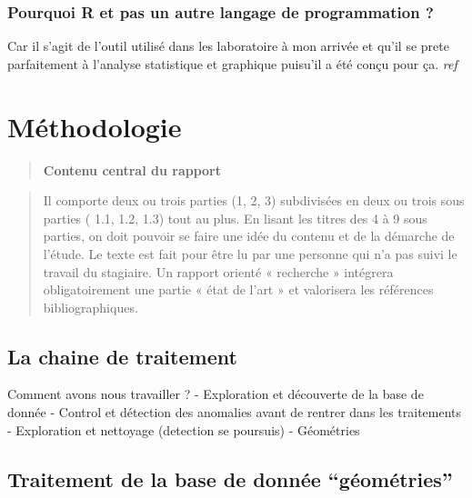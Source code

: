 \documentclass[
  12pt,
  a4paperpaper,
]{book}
\begin{document}
\hypertarget{pourquoi-r-et-pas-un-autre-langage-de-programmation}{%
\subsection{Pourquoi R et pas un autre langage de programmation
?}\label{pourquoi-r-et-pas-un-autre-langage-de-programmation}}

Car il s'agit de l'outil utilisé dans les laboratoire à mon arrivée et
qu'il se prete parfaitement à l'analyse statistique et graphique
puisu'il a été conçu pour ça. \emph{ref}


\hypertarget{muxe9thodologie-1}{%
\chapter{Méthodologie}\label{muxe9thodologie-1}}

\begin{quote}
\textbf{Contenu central du rapport}
\end{quote}

\begin{quote}
Il comporte deux ou trois parties (1, 2, 3) subdivisées en deux ou trois
sous parties ( 1.1, 1.2, 1.3) tout au plus. En lisant les titres des 4 à
9 sous parties, on doit pouvoir se faire une idée du contenu et de la
démarche de l'étude. Le texte est fait pour être lu par une personne qui
n'a pas suivi le travail du stagiaire. Un rapport orienté « recherche »
intégrera obligatoirement une partie « état de l'art » et valorisera les
références bibliographiques.
\end{quote}

\hypertarget{la-chaine-de-traitement}{%
\section{La chaine de traitement}\label{la-chaine-de-traitement}}

Comment avons nous travailler ? - Exploration et découverte de la base
de donnée - Control et détection des anomalies avant de rentrer dans les
traitements - Exploration et nettoyage (detection se poursuis) -
Géométries

\hypertarget{traitement-de-la-base-de-donnuxe9e-guxe9omuxe9tries}{%
\section{Traitement de la base de donnée
``géométries''}\label{traitement-de-la-base-de-donnuxe9e-guxe9omuxe9tries}}
\end{document}

